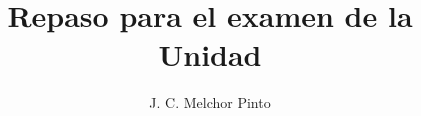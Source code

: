 \documentclass[12pt,addpoints,answers]{repaso}
\title{Repaso para el examen de la Unidad}
\author{J. C. Melchor Pinto}
\begin{document}
\INFO%
\begin{multicols}{2}
     
     
     
     
\end{multicols}
\newpage

\begin{questions}
      \question[6]
     
     \question[6]
     
     
     \newpage
     
     
     \begin{multicols}{2}
          
     \end{multicols}
     \newpage
     
     \newpage
     
     \newpage
     
\end{questions}
\end{document}
